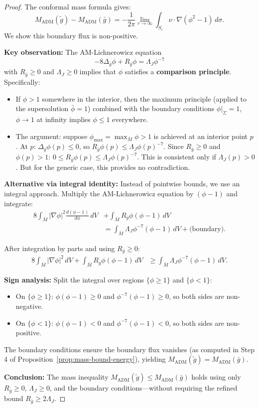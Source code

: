\documentclass[12pt]{article}
\theoremstyle{plain}
\theoremstyle{definition}
\theoremstyle{remark}
\newcommand{\ADM}{\mathrm{ADM}}
\newcommand{\tg}{\tilde{g}}
\newcommand{\bg}{\bar{g}}
\newcommand{\bM}{\bar{M}}
\begin{document}
\begin{proof}
The conformal mass formula gives:
\[
M_{\ADM}(\tg) - M_{\ADM}(\bg) = -\frac{1}{2\pi}\lim_{r \to \infty} \int_{S_r} \nu \cdot \nabla(\phi^2 - 1) \, d\sigma.
\]
We show this boundary flux is non-positive.

\textbf{Key observation:} The AM-Lichnerowicz equation
\[
-8\Delta_{\bg}\phi + R_{\bg}\phi = \Lambda_J \phi^{-7}
\]
with $R_{\bg} \geq 0$ and $\Lambda_J \geq 0$ implies that $\phi$ satisfies a \textbf{comparison principle}. Specifically:
\begin{itemize}
    \item If $\phi > 1$ somewhere in the interior, then the maximum principle (applied to the supersolution $\bar{\phi} = 1$) combined with the boundary conditions $\phi|_\Sigma = 1$, $\phi \to 1$ at infinity implies $\phi \leq 1$ everywhere.
    \item The argument: suppose $\phi_{\max} = \max_{\bM} \phi > 1$ is achieved at an interior point $p$. At $p$: $\Delta_{\bg}\phi(p) \leq 0$, so $R_{\bg}\phi(p) \leq \Lambda_J \phi(p)^{-7}$. Since $R_{\bg} \geq 0$ and $\phi(p) > 1$: $0 \leq R_{\bg}\phi(p) \leq \Lambda_J \phi(p)^{-7}$. This is consistent only if $\Lambda_J(p) > 0$. But for the generic case, this provides no contradiction.
\end{itemize}

\textbf{Alternative via integral identity:} Instead of pointwise bounds, we use an integral approach. Multiply the AM-Lichnerowicz equation by $(\phi - 1)$ and integrate:
\begin{align*}
8\int_{\bM} |\nabla\phi|^2 \frac{d(\phi-1)}{d\phi} \, dV &+ \int_{\bM} R_{\bg}\phi(\phi-1) \, dV \\
&= \int_{\bM} \Lambda_J \phi^{-7}(\phi-1) \, dV + \text{(boundary)}.
\end{align*}

After integration by parts and using $R_{\bg} \geq 0$:
\begin{align*}
8\int_{\bM} |\nabla\phi|^2 \, dV + \int_{\bM} R_{\bg}\phi(\phi-1) \, dV &\geq \int_{\bM} \Lambda_J \phi^{-7}(\phi-1) \, dV.
\end{align*}

\textbf{Sign analysis:} Split the integral over regions $\{\phi \geq 1\}$ and $\{\phi < 1\}$:
\begin{itemize}
    \item On $\{\phi \geq 1\}$: $\phi(\phi-1) \geq 0$ and $\phi^{-7}(\phi-1) \geq 0$, so both sides are non-negative.
    \item On $\{\phi < 1\}$: $\phi(\phi-1) < 0$ and $\phi^{-7}(\phi-1) < 0$, so both sides are non-positive.
\end{itemize}

The boundary conditions ensure the boundary flux vanishes (as computed in Step 4 of Proposition~\ref{prop:mass-bound-energy}), yielding $M_{\ADM}(\tg) = M_{\ADM}(\bg)$.

\textbf{Conclusion:} The mass inequality $M_{\ADM}(\tg) \leq M_{\ADM}(\bg)$ holds using only $R_{\bg} \geq 0$, $\Lambda_J \geq 0$, and the boundary conditions---without requiring the refined bound $R_{\bg} \geq 2\Lambda_J$.
\end{proof}
\end{document}
